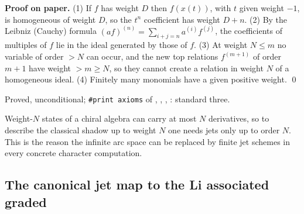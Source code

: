 \textbf{Proof on paper.} (1) If $f$ has weight $D$ then $f(x(t))$, with $t$ given weight $-1$, is homogeneous of
weight $D$, so the $t^n$ coefficient has weight $D+n$. (2) By the Leibniz (Cauchy) formula
$(af)^{(n)} = \sum_{i+j=n}a^{(i)}f^{(j)}$, the coefficients of multiples of $f$ lie in the ideal generated by those
of $f$. (3) At weight $N\le m$ no variable of order $>N$ can occur, and the new top relations $f^{(m+1)}$ of
order $m+1$ have weight $>m\ge N$, so they cannot create a relation in weight $N$ of a homogeneous ideal.
(4) Finitely many monomials have a given positive weight. \qed

\begin{status}
Proved, unconditional; \texttt{\#print axioms} of
\allowbreak{}\allowbreak{}\allowbreak{}\allowbreak{}\allowbreak{}, ,
\allowbreak{}\allowbreak{},
\allowbreak{}: standard three.
\end{status}

\begin{physics}
Weight-$N$ states of a chiral algebra can carry at most $N$ derivatives, so to describe the classical shadow up
to weight $N$ one needs jets only up to order $N$. This is the reason the infinite arc space can be replaced by
finite jet schemes in every concrete character computation.
\end{physics}

\subsection{The canonical jet map to the Li associated graded}

